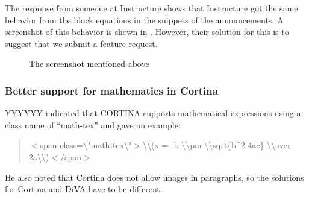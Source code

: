 The response from someone at Instructure shows that Instructure got the same behavior from the block equations in the snippets of the announcements.  A screenshot of this behavior is shown in . However, their solution for this is to suggest that we submit a feature request. 

\begin{figure}[!ht]
  \begin{center}
  \end{center}
  \caption{The screenshot mentioned above}
  \label{fig:screenSHotOfBlockEquation}
\end{figure}
\FloatBarrier



\subsubsection{Better support for mathematics in Cortina}
\label{sec:BetterSupportforMathinCortina}

YYYYYY indicated that CORTINA supports mathematical expressions using a class name of “math-tex” and gave an example:
\begin{quote}
$<$span class=\textbackslash"math-tex\textbackslash"$>$\textbackslash\textbackslash(x = {-b \textbackslash\textbackslash pm \textbackslash\textbackslash sqrt\{b\^{}2-4ac\} \textbackslash\textbackslash over 2a}\textbackslash\textbackslash)$<$/span$>$
\end{quote}


\noindent He also noted that Cortina does not allow images in paragraphs, so the solutions for Cortina and DiVA have to be different.

